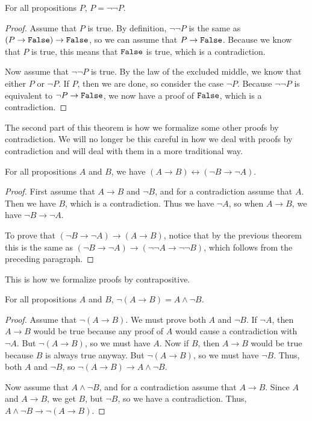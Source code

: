 \documentclass[../../math.tex]{subfiles}
\begin{document}
\begin{theorem} \label{not_not}
    For all propositions $P$, $P = \neg\neg P$.
\end{theorem}
\begin{proof}
    Assume that $P$ is true.  By definition, $\neg\neg P$ is the same as $(P
    \rightarrow \verb|False|) \rightarrow \verb|False|$, so we can assume that
    $P \rightarrow \verb|False|$.  Because we know that $P$ is true, this means
    that $\verb|False|$ is true, which is a contradiction.

    Now assume that $\neg \neg P$ is true.  By the law of the excluded middle,
    we know that either $P$ or $\neg P$.  If $P$, then we are done, so consider
    the case $\neg P$.  Because $\neg \neg P$ is equivalent to $\neg P
    \rightarrow \verb|False|$, we now have a proof of $\verb|False|$, which is a
    contradiction.
\end{proof}
\noindent The second part of this theorem is how we formalize some other proofs
by contradiction.  We will no longer be this careful in how we deal with proofs
by contradiction and will deal with them in a more traditional way.

\begin{theorem}
    For all propositions $A$ and $B$, we have $(A \to B) \leftrightarrow (\neg B
    \to \neg A)$.
\end{theorem}
\begin{proof}
    First assume that $A \to B$ and $\neg B$, and for a contradiction assume
    that $A$.  Then we have $B$, which is a contradiction.  Thus we have $\neg
    A$, so when $A \to B$, we have $\neg B \to \neg A$.

    To prove that $(\neg B \to \neg A) \to (A \to B)$, notice that by the
    previous theorem this is the same as $(\neg B \to \neg A) \to (\neg \neg A
    \to \neg \neg B)$, which follows from the preceding paragraph.
\end{proof}
\noindent This is how we formalize proofs by contrapositive.

\begin{theorem}
    For all propositions $A$ and $B$, $\neg (A \rightarrow B) = A \wedge \neg
    B$.
\end{theorem}
\begin{proof}
    Assume that $\neg (A \rightarrow B)$.  We must prove both $A$ and $\neg B$.
    If $\neg A$, then $A \rightarrow B$ would be true because any proof of $A$
    would cause a contradiction with $\neg A$.  But $\neg (A \rightarrow B)$, so
    we must have $A$.  Now if $B$, then $A \rightarrow B$ would be true because
    $B$ is always true anyway.  But $\neg (A \rightarrow B)$, so we must have
    $\neg B$.  Thus, both $A$ and $\neg B$, so $\neg (A \rightarrow B)
    \rightarrow A \wedge \neg B$.

    Now assume that $A \wedge \neg B$, and for a contradiction assume that $A
    \rightarrow B$.  Since $A$ and $A \rightarrow B$, we get $B$, but $\neg B$,
    so we have a contradiction.  Thus, $A \wedge \neg B \rightarrow \neg(A
    \rightarrow B)$.
\end{proof}
\end{document}
